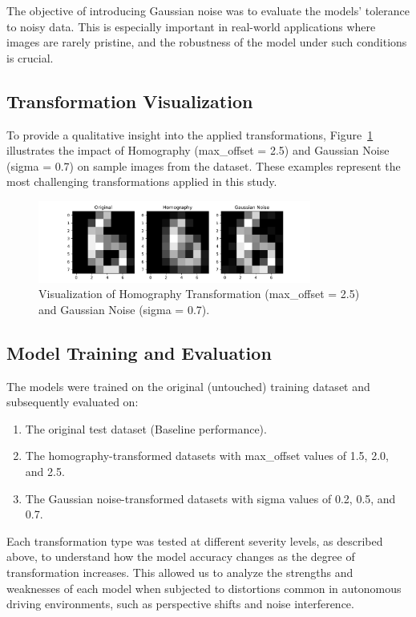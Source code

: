 \documentclass{article}
\begin{document}
The objective of introducing Gaussian noise was to evaluate the models' tolerance to noisy data. This is especially important in real-world applications where images are rarely pristine, and the robustness of the model under such conditions is crucial.

\subsection{Transformation Visualization}
To provide a qualitative insight into the applied transformations, Figure~\ref{fig:experiment_visualization} illustrates the impact of Homography (max\_offset = 2.5) and Gaussian Noise (sigma = 0.7) on sample images from the dataset. These examples represent the most challenging transformations applied in this study.

\begin{figure}[h!]
    \centering
    \includegraphics[width=0.8\textwidth]{images/Experiment.pdf}
    \caption{Visualization of Homography Transformation (max\_offset = 2.5) and Gaussian Noise (sigma = 0.7).}
    \label{fig:experiment_visualization}
\end{figure}

\subsection{Model Training and Evaluation}
The models were trained on the original (untouched) training dataset and subsequently evaluated on:
\begin{enumerate}
    \item The original test dataset (Baseline performance).
    \item The homography-transformed datasets with max\_offset values of 1.5, 2.0, and 2.5.
    \item The Gaussian noise-transformed datasets with sigma values of 0.2, 0.5, and 0.7.
\end{enumerate}

Each transformation type was tested at different severity levels, as described above, to understand how the model accuracy changes as the degree of transformation increases. This allowed us to analyze the strengths and weaknesses of each model when subjected to distortions common in autonomous driving environments, such as perspective shifts and noise interference.
\end{document}
